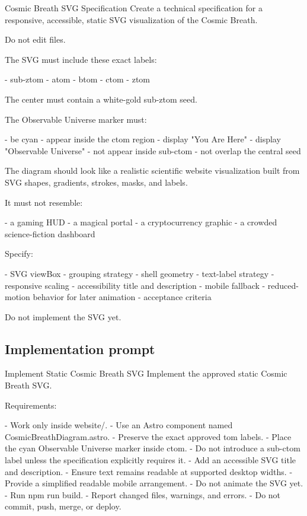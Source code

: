 \documentclass[11pt,letterpaper]{article}
\begin{document}
\begin{promptbox}{Cosmic Breath SVG Specification}
Create a technical specification for a responsive, accessible,
static SVG visualization of the Cosmic Breath.

Do not edit files.

The SVG must include these exact labels:

- sub-ztom
- atom
- btom
- ctom
- ztom

The center must contain a white-gold sub-ztom seed.

The Observable Universe marker must:

- be cyan
- appear inside the ctom region
- display "You Are Here"
- display "Observable Universe"
- not appear inside sub-ctom
- not overlap the central seed

The diagram should look like a realistic scientific website
visualization built from SVG shapes, gradients, strokes, masks,
and labels.

It must not resemble:

- a gaming HUD
- a magical portal
- a cryptocurrency graphic
- a crowded science-fiction dashboard

Specify:

- SVG viewBox
- grouping strategy
- shell geometry
- text-label strategy
- responsive scaling
- accessibility title and description
- mobile fallback
- reduced-motion behavior for later animation
- acceptance criteria

Do not implement the SVG yet.
\end{promptbox}

\subsection{Implementation prompt}

\begin{promptbox}{Implement Static Cosmic Breath SVG}
Implement the approved static Cosmic Breath SVG.

Requirements:

- Work only inside website/.
- Use an Astro component named CosmicBreathDiagram.astro.
- Preserve the exact approved tom labels.
- Place the cyan Observable Universe marker inside ctom.
- Do not introduce a sub-ctom label unless the specification
  explicitly requires it.
- Add an accessible SVG title and description.
- Ensure text remains readable at supported desktop widths.
- Provide a simplified readable mobile arrangement.
- Do not animate the SVG yet.
- Run npm run build.
- Report changed files, warnings, and errors.
- Do not commit, push, merge, or deploy.
\end{promptbox}
\end{document}
